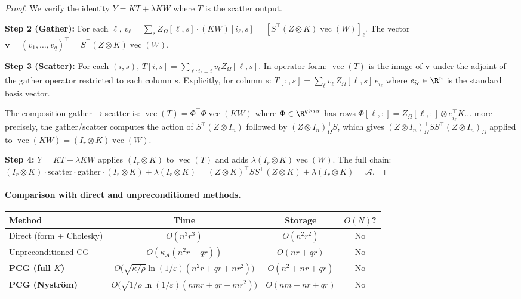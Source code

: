 \begin{proof}
We verify the identity $Y = KT + \lambda KW$ where $T$ is the scatter output.

\textbf{Step 2 (Gather):} For each $\ell$,
$v_\ell = \sum_s Z_\Omega[\ell,s]\cdot(KW)[i_\ell, s]
= [S^\top(Z\otimes K)\operatorname{vec}(W)]_\ell$.
The vector $\mathbf{v} = (v_1,\ldots,v_q)^\top = S^\top(Z\otimes K)\operatorname{vec}(W)$.

\textbf{Step 3 (Scatter):} For each $(i, s)$,
$T[i,s] = \sum_{\ell:i_\ell=i} v_\ell Z_\Omega[\ell,s]$.
In operator form: $\operatorname{vec}(T)$ is the image of $\mathbf{v}$
under the adjoint of the gather operator restricted to each column $s$.
Explicitly, for column $s$:
$T[:,s] = \sum_\ell v_\ell\,Z_\Omega[\ell,s]\,e_{i_\ell}$
where $e_{i_\ell}\in\R^n$ is the standard basis vector.

The composition gather$\to$scatter is:
$\operatorname{vec}(T) = \Phi^\top\Phi\operatorname{vec}(KW)$
where $\Phi\in\R^{q\times nr}$ has rows
$\Phi[\ell,:] = Z_\Omega[\ell,:]\otimes e_{i_\ell}^\top K$... more precisely,
the gather/scatter computes the action of $S^\top(Z\otimes I_n)$
followed by $(Z\otimes I_n)^\top_\Omega S$, which gives
$(Z\otimes I_n)^\top_\Omega SS^\top(Z\otimes I_n)_\Omega$ applied to
$\operatorname{vec}(KW) = (I_r\otimes K)\operatorname{vec}(W)$.

\textbf{Step 4:}
$Y = KT + \lambda KW$ applies $(I_r\otimes K)$ to $\operatorname{vec}(T)$
and adds $\lambda(I_r\otimes K)\operatorname{vec}(W)$.
The full chain: $(I_r\otimes K)\cdot\text{scatter}\cdot\text{gather}\cdot(I_r\otimes K)
+ \lambda(I_r\otimes K) = (Z\otimes K)^\top SS^\top(Z\otimes K) + \lambda(I_r\otimes K) = \mathcal{A}$.
\end{proof}

\paragraph{Comparison with direct and unpreconditioned methods.}

\begin{center}
\begin{tabular}{@{}lccc@{}}
\toprule
\textbf{Method} & \textbf{Time} & \textbf{Storage} & \textbf{$O(N)$?} \\
\midrule
Direct (form + Cholesky) & $O(n^3 r^3)$ & $O(n^2 r^2)$ & No \\
Unpreconditioned CG & $O(\kappa_\mathcal{A}(n^2 r + qr))$ & $O(nr + qr)$ & No \\
\textbf{PCG (full $K$)} & $O\bigl(\sqrt{\kappa/\rho}\ln(1/\varepsilon)(n^2r+qr+nr^2)\bigr)$ & $O(n^2+nr+qr)$ & No \\
\textbf{PCG (Nystr\"om)} & $O\bigl(\sqrt{1/\rho}\ln(1/\varepsilon)(nmr+qr+mr^2)\bigr)$ & $O(nm+nr+qr)$ & No \\
\bottomrule
\end{tabular}
\end{center}

